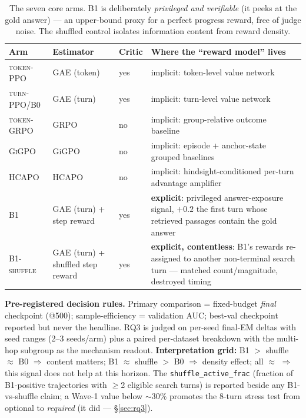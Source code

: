\documentclass[11pt,a4paper]{article}
\newcommand{\arm}[1]{\textsc{#1}}
\begin{document}
\begin{table}[h]
\centering\small
\begin{tabular}{lllp{5.7cm}}
\toprule
Arm & Estimator & Critic & Where the ``reward model'' lives \\
\midrule
\arm{token-PPO}   & GAE (token)      & yes & implicit: token-level value network \\
\arm{turn-PPO/B0} & GAE (turn)       & yes & implicit: turn-level value network \\
\arm{token-GRPO}  & GRPO             & no  & implicit: group-relative outcome baseline \\
\arm{GiGPO}       & GiGPO            & no  & implicit: episode + anchor-state grouped baselines \\
\arm{HCAPO}       & HCAPO            & no  & implicit: hindsight-conditioned per-turn advantage amplifier \\
\arm{B1}          & GAE (turn) + step reward & yes & \textbf{explicit}: privileged answer-exposure signal, $+0.2$ the first turn whose retrieved passages contain the gold answer \\
\arm{B1-shuffle}  & GAE (turn) + shuffled step reward & yes & \textbf{explicit, contentless}: B1's rewards re-assigned to another non-terminal search turn --- matched count/magnitude, destroyed timing \\
\bottomrule
\end{tabular}
\caption{The seven core arms. B1 is deliberately \emph{privileged and verifiable} (it peeks at the
gold answer) --- an upper-bound proxy for a perfect progress reward, free of judge noise. The
shuffled control isolates information content from reward density.}
\end{table}

\textbf{Pre-registered decision rules.} Primary comparison = fixed-budget \emph{final} checkpoint
(@500); sample-efficiency = validation AUC; best-val checkpoint reported but never the headline.
RQ3 is judged on per-seed final-EM deltas with seed ranges (2--3 seeds/arm) plus a paired
per-dataset breakdown with the multi-hop subgroup as the mechanism readout. \textbf{Interpretation
grid:} B1 $>$ shuffle $\approx$ B0 $\Rightarrow$ content matters; B1 $\approx$ shuffle $>$ B0
$\Rightarrow$ density effect; all $\approx$ $\Rightarrow$ this signal does not help at this
horizon. The \texttt{shuffle\_active\_frac} (fraction of B1-positive trajectories with $\geq$2
eligible search turns) is reported beside any B1-vs-shuffle claim; a Wave-1 value below $\sim$30\%
promotes the 8-turn stress test from optional to \emph{required} (it did --- \S\ref{sec:rq3}).
\end{document}
